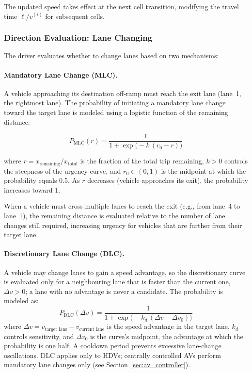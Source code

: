 \documentclass[review,authoryear]{elsarticle}
\begin{document}
The updated speed takes effect at the next cell transition, modifying the travel time $\ell / v^{(i)}$ for subsequent cells.

\subsubsection{Direction Evaluation: Lane Changing}
\label{sec:lane_changing}

The driver evaluates whether to change lanes based on two mechanisms:

\paragraph{Mandatory Lane Change (MLC).}
A vehicle approaching its destination off-ramp must reach the exit lane (lane~1, the rightmost lane). The probability of initiating a mandatory lane change toward the target lane is modeled using a logistic function of the remaining distance:

\begin{equation}
    P_{\text{MLC}}(r) = \frac{1}{1 + \exp\!\big(-k\,(r_0 - r)\big)}
    \label{eq:mlc_logistic}
\end{equation}

where $r = x_{\text{remaining}} / x_{\text{total}}$ is the fraction of the total trip remaining, $k > 0$ controls the steepness of the urgency curve, and $r_0 \in (0, 1)$ is the midpoint at which the probability equals 0.5. As $r$ decreases (vehicle approaches its exit), the probability increases toward 1.

When a vehicle must cross multiple lanes to reach the exit (e.g., from lane~4 to lane~1), the remaining distance is evaluated relative to the number of lane changes still required, increasing urgency for vehicles that are further from their target lane.

\paragraph{Discretionary Lane Change (DLC).}
A vehicle may change lanes to gain a speed advantage, so the discretionary curve is evaluated only for a neighbouring lane that is faster than the current one, $\Delta v > 0$; a lane with no advantage is never a candidate. The probability is modeled as:
\begin{equation}
    P_{\text{DLC}}(\Delta v) = \frac{1}{1 + \exp\!\big(-k_d\,(\Delta v - \Delta v_0)\big)}
    \label{eq:dlc_logistic}
\end{equation}
where $\Delta v = v_{\text{target lane}} - v_{\text{current lane}}$ is the speed advantage in the target lane, $k_d$ controls sensitivity, and $\Delta v_0$ is the curve's midpoint, the advantage at which the probability is one half. A cooldown period prevents excessive lane-change oscillations. DLC applies only to HDVs; centrally controlled AVs perform mandatory lane changes only (see Section~\ref{sec:av_controller}).
\end{document}
